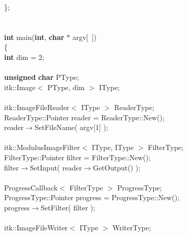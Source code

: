 \begin{flushleft}
\};\mbox{}\\
\mbox{}\\
\mbox{}\\
{\bf int} main({\bf int}, {\bf char} $\ast$ argv[~])\mbox{}\\
\{\mbox{}\\
\hspace*{2\indentation}{\bf const} {\bf int} dim = 2;\mbox{}\\
\hspace*{2\indentation}\mbox{}\\
\hspace*{2\indentation}{\bf typedef} {\bf unsigned} {\bf char} PType;\mbox{}\\
\hspace*{2\indentation}{\bf typedef} itk::Image$<$ PType, dim $>$ IType;\mbox{}\\
\mbox{}\\
\hspace*{2\indentation}{\bf typedef} itk::ImageFileReader$<$ IType $>$ ReaderType;\mbox{}\\
\hspace*{2\indentation}ReaderType::Pointer reader = ReaderType::New();\mbox{}\\
\hspace*{2\indentation}reader$\rightarrow$SetFileName( argv[1] );\mbox{}\\
\mbox{}\\
\hspace*{2\indentation}{\bf typedef} itk::ModulusImageFilter$<$ IType, IType $>$ FilterType;\mbox{}\\
\hspace*{2\indentation}FilterType::Pointer filter = FilterType::New();\mbox{}\\
\hspace*{2\indentation}filter$\rightarrow$SetInput( reader$\rightarrow$GetOutput() );\mbox{}\\
\mbox{}\\
\hspace*{2\indentation}{\bf typedef} ProgressCallback$<$ FilterType $>$ ProgressType;\mbox{}\\
\hspace*{2\indentation}ProgressType::Pointer progress = ProgressType::New();\mbox{}\\
\hspace*{2\indentation}progress$\rightarrow$SetFilter( filter );\mbox{}\\
\mbox{}\\
\hspace*{2\indentation}{\bf typedef} itk::ImageFileWriter$<$ IType $>$ WriterType;\mbox{}\\

\end{flushleft}
